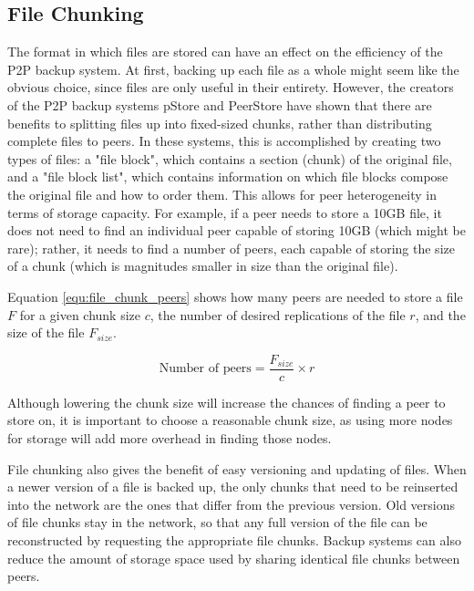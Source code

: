 \documentclass[12pt]{report}
\begin{document}
\subsection{File Chunking} \label{sec:filechunking}
The format in which files are stored can have an effect on the efficiency of the P2P backup system. At first, backing up each file as a whole might seem like the obvious choice, since files are only useful in their entirety. However, the creators of the P2P backup systems pStore \cite{pStore} and PeerStore \cite{PeerStore} have shown that there are benefits to splitting files up into fixed-sized chunks, rather than distributing complete files to peers. In these systems, this is accomplished by creating two types of files: a "file block", which contains a section (chunk) of the original file, and a "file block list", which contains information on which file blocks compose the original file and how to order them. This allows for peer heterogeneity in terms of storage capacity. For example, if a peer needs to store a 10GB file, it does not need to find an individual peer capable of storing 10GB (which might be rare); rather, it needs to find a number of peers, each capable of storing the size of a chunk (which is magnitudes smaller in size than the original file).

Equation \ref{equ:file_chunk_peers} shows how many peers are needed to store a file $F$ for a given chunk size $c$, the number of desired replications of the file $r$, and the size of the file $F_{size}$.

\begin{equation} \label{equ:file_chunk_peers}
\text{Number of peers} = \frac{F_{size}}{c} \times r
\end{equation}

Although lowering the chunk size will increase the chances of finding a peer to store on, it is important to choose a reasonable chunk size, as using more nodes for storage will add more overhead in finding those nodes.

File chunking also gives the benefit of easy versioning and updating of files. When a newer version of a file is backed up, the only chunks that need to be reinserted into the network are the ones that differ from the previous version. Old versions of file chunks stay in the network, so that any full version of the file can be reconstructed by requesting the appropriate file chunks. Backup systems can also reduce the amount of storage space used by sharing identical file chunks between peers.
\end{document}
